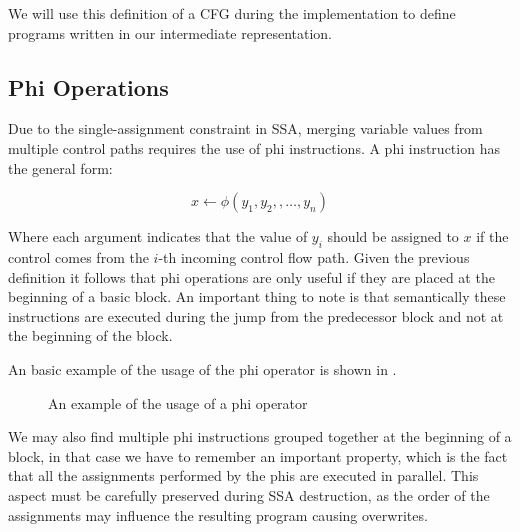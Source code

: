 We will use this definition of a CFG during the implementation to define programs written in our intermediate representation.

\subsection{Phi Operations}
\label{subsec:phi}

Due to the single-assignment constraint in SSA, merging variable values from multiple control paths requires the use of phi instructions. A phi instruction has the general form:

\[
x \leftarrow \phi(y_1, y_2, , \dots, y_n)
\]

Where each argument indicates that the value of $y_i$ should be assigned to $x$ if the control comes from the $i$-th incoming control flow path. Given the previous definition it follows that phi operations are only useful if they are placed at the beginning of a basic block. An important thing to note is that semantically these instructions are executed during the jump from the predecessor block and not at the beginning of the block.

An basic example of the usage of the phi operator is shown in .

\begin{figure}[ht]
    \centering
    \caption{An example of the usage of a phi operator}
    \label{fig:phi-usage}
\end{figure}

We may also find multiple phi instructions grouped together at the beginning of a block, in that case we have to remember an important property, which is the fact that all the assignments performed by the phis are executed in parallel. This aspect must be carefully preserved during SSA destruction, as the order of the assignments may influence the resulting program causing overwrites.


